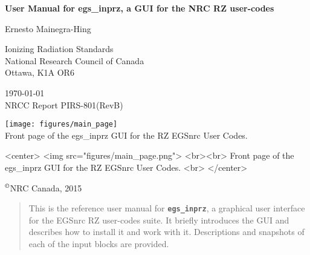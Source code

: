 \documentclass[12pt,twoside]{article}   %
\newcommand{\supcopyright}{$^{\copyright}$}       %
\begin{document}
\begin{center}
{\sffamily \bfseries {\Huge User Manual for egs\_inprz, a GUI for the NRC RZ user-codes}
\vspace{5mm}\\}
\begin{Large}
Ernesto Mainegra-Hing \\
\end{Large}
Ionizing Radiation Standards\\
National Research Council of Canada
\\Ottawa, K1A OR6\\
\vspace{10mm}

\today \vspace{3mm}\\
\hfill NRCC Report {\sf PIRS-801}(RevB) \vspace*{10mm}\\

\begin{latexonly}
\begin{center}
\texttt{[image: figures/main\_page]}
\vspace{5mm}
\\Front page of the egs\_inprz GUI for the RZ EGSnrc User Codes.
\vspace{10mm}\\
\end{center}
\end{latexonly}
\begin{htmlonly}
\begin{rawhtml}
<center>
<img src="figures/main_page.png">
<br><br>
Front page of the egs\_inprz GUI for the RZ EGSnrc User Codes.
<br>
</center>
\end{rawhtml}
\end{htmlonly}

\supcopyright NRC Canada, 2015

\end{center}
\newpage   %
\mbox{}



\pagestyle{empty}

\pagestyle{fancy}



\newpage
\begin{abstract}

This is the reference user manual for {\bf \tt egs\_inprz}, a graphical user interface
for the EGSnrc RZ user-codes suite. It briefly introduces the GUI and describes how
to install it and work with it. Descriptions and snapshots of each of the input blocks
are provided.

\end{abstract}
\end{document}
